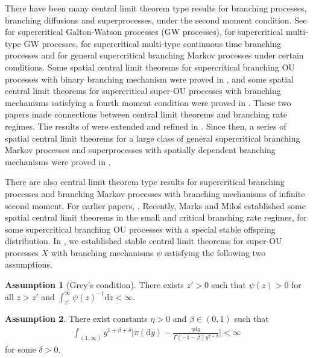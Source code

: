 \documentclass[12pt,a4paper]{amsart}
\theoremstyle{plain}
\theoremstyle{definition}
\newtheorem{asp}{Assumption}
\numberwithin{equation}{section}
\begin{document}
	There have been many central limit theorem type results for branching processes, branching diffusions and superprocesses, under the second moment condition.
	See \cite{Heyde1970A-rate, HeydeBrown1871An-invariance, HeydeLeslie1971Improved} for supercritical Galton-Watson processes (GW processes), \cite{KestenStigum1966Additional,KestenStigum1966A-limit} for supercritical multi-type GW processes, \cite{Athreya1969Limit,Athreya1969LimitB,Athreya1971Some} for supercritical multi-type continuous time branching processes and \cite{AsmussenHering1983Branching} for general supercritical branching Markov processes under certain conditions.
	Some spatial central limit theorems for supercritical branching OU processes with binary branching mechanism were proved
	in \cite{AdamczakMilos2015CLT}, and some
	spatial central limit theorems for supercritical super-OU processes with branching mechanisms satisfying a fourth moment condition were proved in \cite{Milos2012Spatial}.
	These two papers made connections between central limit theorems and branching rate regimes.
	The results of \cite{Milos2012Spatial} were extended and refined in \cite{RenSongZhang2014Central}.
		Since then, a series of spatial central limit theorems for a large class of general supercritical branching Markov processes and superprocesses with spatially dependent branching mechanisms were proved in \cite{RenSongZhang2014CentralB,RenSongZhang2015Central,RenSongZhang2017Central}.

There are also  central  limit theorem type results for supercritical branching processes and branching Markov processes with branching mechanisms of infinite second moment. For earlier
papers, \cite{Heyde1971Some, Asmussen76Convergence}. 	Recently, Marks and Milo\'s \cite{MarksMilos2018CLT} established some spatial central limit theorems in the small and critical branching rate regimes, for
some supercritical branching OU processes with a special stable offspring distribution.
In \cite{RenSongSunZhao2019Stable}, we
established stable central limit theorems for
super-OU processes $X$ with branching mechanisms $\psi$ satisfying the following two assumptions.


\begin{asp}[Grey's condition]
	\label{asp: Greys condition}
	There exists $z' > 0$ such that $\psi(z) > 0$ for all $z>z'$ and  $\int_{z'}^\infty \psi(z)^{-1} \mathrm dz < \infty$.
\end{asp}

\begin{asp}
	\label{asp: branching mechanism}
  There exist constants $\eta > 0$ and $\beta \in (0,1)$ such that
  \begin{align}
    \int_{(1,\infty)}y^{1+\beta +\delta}\Big|\pi(\mathrm dy)-\frac{\eta \mathrm dy}{\Gamma(-1-\beta)y^{2+\beta}}\Big| <\infty
  \end{align}
for some $\delta > 0$.
\end{asp}
\end{document}
